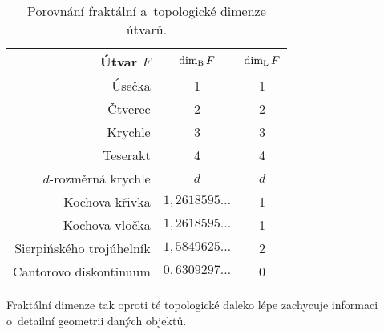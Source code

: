 \begin{table}[h]
    \centering
    \begin{tabular}{r|cc}
    Útvar $F$                & $\operatorname{dim_B}{F}$            & $\operatorname{dim_L}{F}$ \\\hline
    Úsečka                   & 1                     & 1          \\
    Čtverec                  & 2                     & 2          \\
    Krychle                  & 3                     & 3          \\
    Teserakt                 & 4                     & 4          \\
    $d$-rozměrná krychle     & $d$                   & $d$        \\
    Kochova křivka           & $1{,}2618595\dots$    & 1          \\
    Kochova vločka           & $1{,}2618595\dots$    & 1          \\
    Sierpińského trojúhelník & $1{,}5849625\dots$    & 2          \\
    Cantorovo diskontinuum   & $0{,}6309297\dots$    & 0      
    \end{tabular}
    \caption{Porovnání fraktální a~topologické dimenze útvarů.}
    \label{table:fraktalni-topologicka-dimenze}
\end{table}
Fraktální dimenze tak oproti té topologické daleko lépe zachycuje informaci o~detailní geometrii daných objektů.